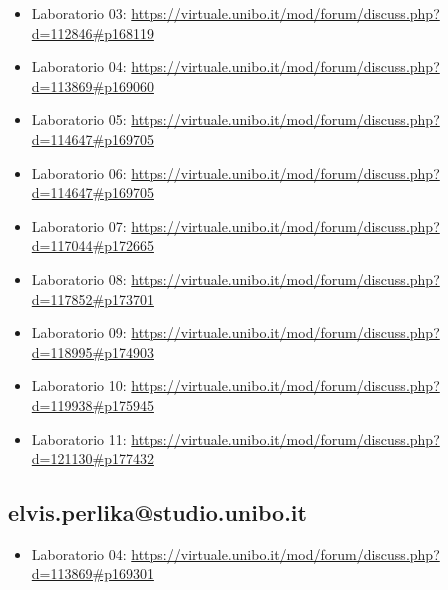 \documentclass[a4paper,12pt]{report}
\begin{document}
\begin{itemize}
	\item Laboratorio 03: \url{https://virtuale.unibo.it/mod/forum/discuss.php?d=112846#p168119}
	\item Laboratorio 04: \url{https://virtuale.unibo.it/mod/forum/discuss.php?d=113869#p169060}
	\item Laboratorio 05: \url{https://virtuale.unibo.it/mod/forum/discuss.php?d=114647#p169705}
	\item Laboratorio 06: \url{https://virtuale.unibo.it/mod/forum/discuss.php?d=114647#p169705}
	\item Laboratorio 07: \url{https://virtuale.unibo.it/mod/forum/discuss.php?d=117044#p172665}
	\item Laboratorio 08: \url{https://virtuale.unibo.it/mod/forum/discuss.php?d=117852#p173701}
	\item Laboratorio 09: \url{https://virtuale.unibo.it/mod/forum/discuss.php?d=118995#p174903}
	\item Laboratorio 10: \url{https://virtuale.unibo.it/mod/forum/discuss.php?d=119938#p175945}
	\item Laboratorio 11: \url{https://virtuale.unibo.it/mod/forum/discuss.php?d=121130#p177432}
\end{itemize}


\subsection{elvis.perlika@studio.unibo.it}

\begin{itemize}
	\item Laboratorio 04: \url{https://virtuale.unibo.it/mod/forum/discuss.php?d=113869#p169301}
\end{itemize}



\end{document}

